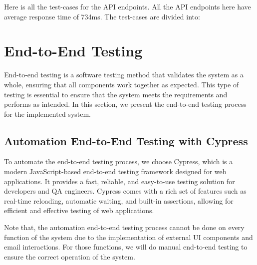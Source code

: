Here is all the test-cases for the API endpoints. All the API endpoints
here have average response time of 734ms. The test-cases are divided into:






















\section{End-to-End Testing}

End-to-end testing is a software testing method that validates the system as a whole, ensuring that all components work together as expected. This type of testing is essential to ensure that the system meets the requirements and performs as intended. In this section, we present the end-to-end testing process for the implemented system.

\subsection{Automation End-to-End Testing with Cypress}

To automate the end-to-end testing process, we choose Cypress, which is a modern JavaScript-based end-to-end testing framework designed for web applications. It provides a fast, reliable, and easy-to-use testing solution for developers and QA engineers. Cypress comes with a rich set of features such as real-time reloading, automatic waiting, and built-in assertions,  allowing for efficient and effective testing of web applications.

Note that, the automation end-to-end testing process cannot be done on every function of the system due to the implementation of external UI components and email interactions. For those functions, we will do manual end-to-end testing to ensure the correct operation of the system.

